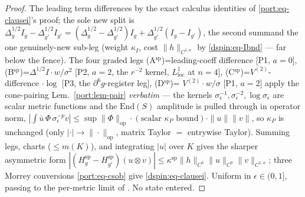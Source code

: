 \begin{proof}
The leading term differences by the exact calculus identities of
\eqref{port:eq-clausei}'s proof; the sole new split is
$\Delta^{1/2}_g I_g-\Delta^{1/2}_{g'}I_{g'}
=(\Delta^{1/2}_g-\Delta^{1/2}_{g'})I_g+\Delta^{1/2}_{g'}(I_g-I_{g'})$, the
second summand the one genuinely-new sub-leg (weight $\kappa_I$, cost
$\|h\|_{C^{1,\alpha}}$ by \eqref{dspin:eq-Ibnd} --- far below the fence). The
four graded legs (A$^{\mathrm{sp}}$)=leading-coeff difference [P1, $a=0$],
(B$^{\mathrm{sp}}$)=$\Delta^{1/2}I\cdot w/\sigma^2$ [P2, $a=2$, the $r^{-2}$
kernel, $L^1_{\mathrm{loc}}$ at $n=4$], (C$^{\mathrm{sp}}$)=$V^{(2)}$-difference
$\cdot\log$ [P3, the $\partial^6g$-register leg], (D$^{\mathrm{sp}}$)=
$V^{(2)}\cdot w/\sigma$ [P1, $a=2$] apply the cone-pairing
Lem.~\ref{port:lem-pair} \emph{verbatim} --- the kernels $\sigma_\epsilon^{-1},
\sigma_\epsilon^{-2},\log\sigma_\epsilon$ are scalar metric functions and the
$\mathrm{End}(S)$ amplitude is pulled through in operator norm,
$|\int\bar u\,\Phi\,\sigma_\epsilon^{-p}v|\le\sup\|\Phi\|_{\mathrm{op}}\cdot
(\text{scalar }\kappa_P\text{ bound})\cdot\|u\|\|v\|$, so $\kappa_P$ is
unchanged (only $|\cdot|\to\|\cdot\|_{\mathrm{op}}$, matrix Taylor $=$ entrywise
Taylor). Summing legs, charts ($\le m(K)$), and integrating $|u|$ over $K$
gives the sharper asymmetric form
$|(H^{\mathrm{sp}}_g-H^{\mathrm{sp}}_{g'})(u\otimes v)|\le\kappa^{\mathrm{sp}}
\|h\|_{C^6}\|u\|_{C^0}\|v\|_{C^{1,\alpha}}$; three Morrey conversions
\eqref{port:eq-csob} give \eqref{dspin:eq-clausei}. Uniform in
$\epsilon\in(0,1]$, passing to the per-metric limit of
\cite{DappiaggiHackPinamonti2009,Moretti2003}. No state entered.
\end{proof}

